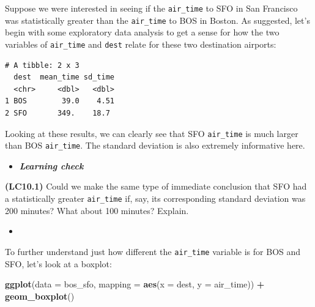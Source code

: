 \documentclass[12pt, krantz2,]{krantz}
\makeatletter
\newenvironment{Shaded}{\begin{snugshade}}{\end{snugshade}}
\newcommand{\DataTypeTok}[1]{\textcolor[rgb]{0.27,0.27,0.27}{#1}}
\newcommand{\KeywordTok}[1]{\textcolor[rgb]{0.27,0.27,0.27}{\textbf{#1}}}
\newcommand{\NormalTok}[1]{#1}
\newcommand{\OperatorTok}[1]{\textcolor[rgb]{0.43,0.43,0.43}{\textbf{#1}}}
\newcommand{\StringTok}[1]{\textcolor[rgb]{0.5,0.5,0.5}{#1}}
\newenvironment{kframe}{%
\medskip{}
\setlength{\fboxsep}{.8em}
 \def\at@end@of@kframe{}%
 \ifinner\ifhmode%
  \def\at@end@of@kframe{\end{minipage}}%
  \begin{minipage}{\columnwidth}%
 \fi\fi%
 \def\FrameCommand##1{\hskip\@totalleftmargin \hskip-\fboxsep
 \colorbox{shadecolor}{##1}\hskip-\fboxsep
     \hskip-\linewidth \hskip-\@totalleftmargin \hskip\columnwidth}%
 \MakeFramed {\advance\hsize-\width
   \@totalleftmargin\z@ \linewidth\hsize
   \@setminipage}}%
 {\par\unskip\endMakeFramed%
 \at@end@of@kframe}
\renewenvironment{Shaded}{\begin{kframe}}{\end{kframe}}
\newenvironment{rmdblock}[1]
  {\begin{shaded*}
  \begin{itemize}
  \renewcommand{\labelitemi}{
    \raisebox{-.7\height}[0pt][0pt]{
    }
  }
  \item
  }
  {
  \end{itemize}
  \end{shaded*}
  }
\newenvironment{learncheck}
  {\begin{rmdblock}{warning}}
  {\end{rmdblock}}
\makeatother
\begin{document}
Suppose we were interested in seeing if the \texttt{air\_time} to SFO in San Francisco was statistically greater than the \texttt{air\_time} to BOS in Boston. As suggested, let's begin with some exploratory data analysis to get a sense for how the two variables of \texttt{air\_time} and \texttt{dest} relate for these two destination airports:

\begin{Shaded}
\end{Shaded}

\begin{verbatim}
# A tibble: 2 x 3
  dest  mean_time sd_time
  <chr>     <dbl>   <dbl>
1 BOS        39.0    4.51
2 SFO       349.    18.7 
\end{verbatim}

Looking at these results, we can clearly see that SFO \texttt{air\_time} is much larger than BOS \texttt{air\_time}. The standard deviation is also extremely informative here.

\begin{learncheck}
\textbf{\emph{Learning check}}
\end{learncheck}

\textbf{(LC10.1)} Could we make the same type of immediate conclusion that SFO had a statistically greater \texttt{air\_time} if, say, its corresponding standard deviation was 200 minutes? What about 100 minutes? Explain.

\begin{learncheck}

\end{learncheck}

To further understand just how different the \texttt{air\_time} variable is for BOS and SFO, let's look at a boxplot:

\begin{Shaded}
\begin{Highlighting}[]
\KeywordTok{ggplot}\NormalTok{(}\DataTypeTok{data =}\NormalTok{ bos_sfo, }\DataTypeTok{mapping =} \KeywordTok{aes}\NormalTok{(}\DataTypeTok{x =}\NormalTok{ dest, }\DataTypeTok{y =}\NormalTok{ air_time)) }\OperatorTok{+}
\StringTok{  }\KeywordTok{geom_boxplot}\NormalTok{()}
\end{Highlighting}
\end{Shaded}
\end{document}
